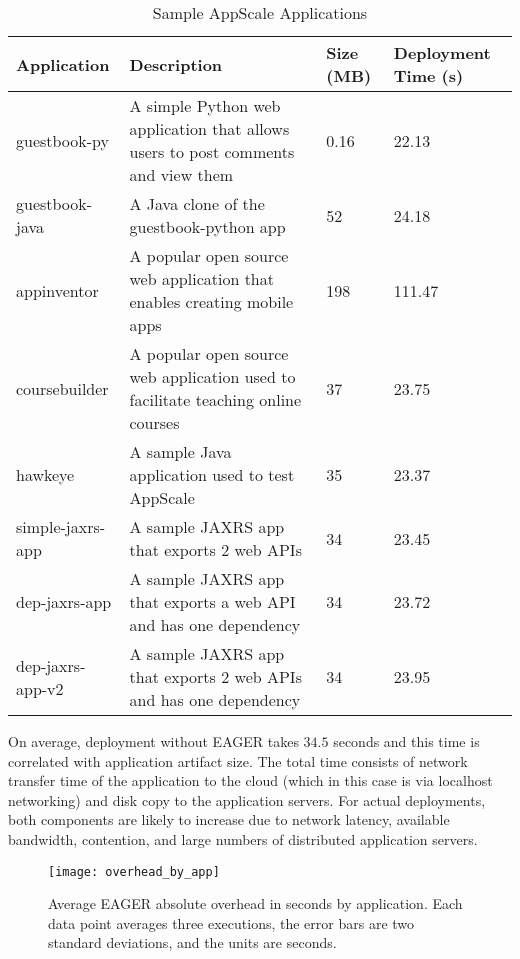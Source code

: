 \begin{table}[t]
\begin{center}
\begin{tabular}{| p{3cm} | p{6.5cm} | p{1cm} | p{2.2cm} | }
\hline
Application & Description & Size (MB) & Deployment Time (s) \\ \hline
guestbook-py & A simple Python web application that allows users to post
comments and view them & 0.16 & 22.13 \\ \hline
guestbook-java & A Java clone of the guestbook-python app & 52 & 24.18 \\ \hline
appinventor & A popular open source web application that enables creating mobile apps & 198 & 111.47 \\ \hline
coursebuilder & A popular open source web application used to facilitate teaching online courses & 37 & 23.75 \\ \hline
hawkeye & A sample Java application used to test AppScale & 35 & 23.37 \\ \hline
simple-jaxrs-app & A sample JAXRS app that exports 2 web APIs & 34 & 23.45 \\ \hline
dep-jaxrs-app & A sample JAXRS app that exports a web API and has one dependency & 34 & 23.72 \\ \hline
dep-jaxrs-app-v2 & A sample JAXRS app that exports 2 web APIs and has one dependency & 34 & 23.95 \\ \hline
\end{tabular}
\end{center}
\caption{Sample AppScale Applications}
\label{tab:sample_apps}
\end{table}

On average, deployment without EAGER takes $34.5$ seconds and this time 
is correlated with application artifact size.  The total time consists
of network transfer time of the application to the cloud (which in this 
case is via localhost networking) and disk copy to the application servers.
For actual deployments, both components are likely to increase due to network
latency, available bandwidth, contention, and large numbers of distributed
application servers.


\begin{figure*}
\centering
\texttt{[image: overhead\_by\_app]}
\caption{Average EAGER absolute overhead in seconds by application.  Each
data point averages three
executions, the error
bars are two standard deviations, and the units are seconds.}
\label{fig:overhead_by_app}
\vspace{-0.2in}
\end{figure*}

